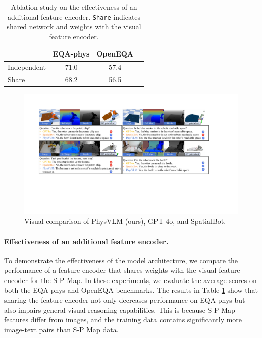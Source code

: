 \documentclass[10pt,twocolumn,letterpaper]{article}
\begin{document}
\begin{table}[ht]
\caption{Ablation study on the effectiveness of an additional feature encoder. \texttt{Share} indicates shared network and weights with the visual feature encoder.}
\label{table6}

\begin{center}
\begin{small}
\begin{sc}
\begin{tabular}{lccc}
\toprule
    & EQA-phys & OpenEQA \\
\midrule
Independent & 71.0 & 57.4 & \\
Share       & 68.2 & 56.5 & \\
\bottomrule
\end{tabular}
\end{sc}
\end{small}
\end{center}
\vskip -0.1in
\end{table}

\begin{figure}[ht] %
\vskip 0.2in
\begin{center}
\centerline{\includegraphics[width=0.94\linewidth]{images/image6.pdf}}
\caption{Visual comparison of PhysVLM (ours), GPT-4o, and SpatialBot.}
\label{image6}
\end{center}
\vskip -0.2in
\end{figure}

\paragraph{Effectiveness of an additional feature encoder.}
To demonstrate the effectiveness of the model architecture, we compare the performance of a feature encoder that shares weights with the visual feature encoder for the S-P Map. In these experiments, we evaluate the average scores on both the EQA-phys and OpenEQA benchmarks. The results in Table \ref{table6} show that sharing the feature encoder not only decreases performance on EQA-phys but also impairs general visual reasoning capabilities. This is because S-P Map features differ from images, and the training data contains significantly more image-text pairs than S-P Map data.
\end{document}
